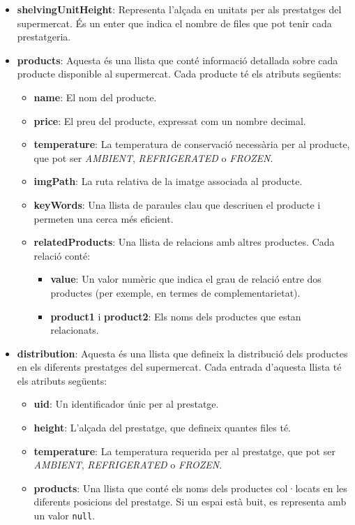 \documentclass[a4paper,12pt]{report}
\begin{document}
\begin{itemize}
	\item \textbf{shelvingUnitHeight}: Representa l'alçada en unitats per als prestatges del supermercat. És un enter que indica el nombre de files que pot tenir cada prestatgeria.

	\item \textbf{products}: Aquesta és una llista que conté informació detallada sobre cada producte disponible al supermercat. Cada producte té els atributs següents:
	      \begin{itemize}
		      \item \textbf{name}: El nom del producte.
		      \item \textbf{price}: El preu del producte, expressat com un nombre decimal.
		      \item \textbf{temperature}: La temperatura de conservació necessària per al producte, que pot ser \textit{AMBIENT}, \textit{REFRIGERATED} o \textit{FROZEN}.
		      \item \textbf{imgPath}: La ruta relativa de la imatge associada al producte.
		      \item \textbf{keyWords}: Una llista de paraules clau que descriuen el producte i permeten una cerca més eficient.
		      \item \textbf{relatedProducts}: Una llista de relacions amb altres productes. Cada relació conté:
		            \begin{itemize}
			            \item \textbf{value}: Un valor numèric que indica el grau de relació entre dos productes (per exemple, en termes de complementarietat).
			            \item \textbf{product1} i \textbf{product2}: Els noms dels productes que estan relacionats.
		            \end{itemize}
	      \end{itemize}

	\item \textbf{distribution}: Aquesta és una llista que defineix la distribució dels productes en els diferents prestatges del supermercat. Cada entrada d'aquesta llista té els atributs següents:
	      \begin{itemize}
		      \item \textbf{uid}: Un identificador únic per al prestatge.
		      \item \textbf{height}: L'alçada del prestatge, que defineix quantes files té.
		      \item \textbf{temperature}: La temperatura requerida per al prestatge, que pot ser \textit{AMBIENT}, \textit{REFRIGERATED} o \textit{FROZEN}.
		      \item \textbf{products}: Una llista que conté els noms dels productes col·locats en les diferents posicions del prestatge. Si un espai està buit, es representa amb un valor \texttt{null}.
	      \end{itemize}
\end{itemize}
\end{document}
